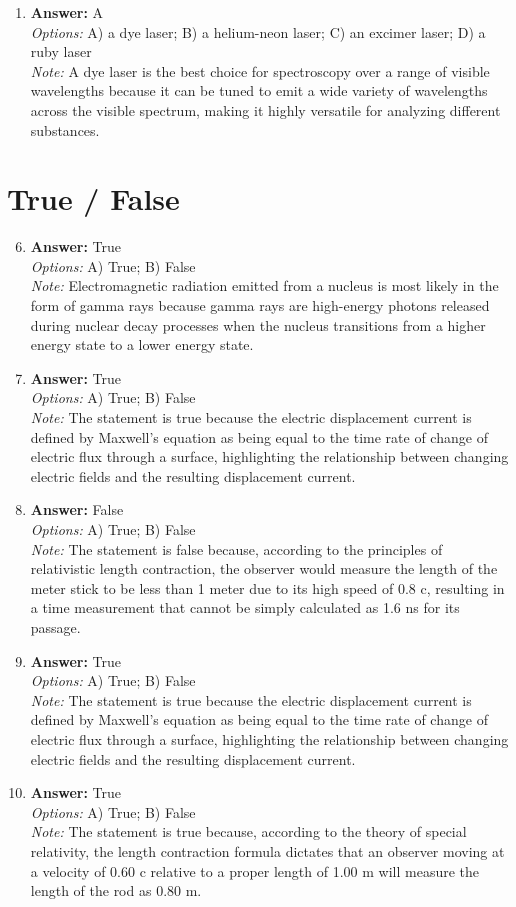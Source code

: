 \documentclass[12pt]{article}
\begin{document}
\begin{enumerate}[label=\arabic*.]
\item \textbf{Answer:} A
\\ \textit{Options:} A) a dye laser; B) a helium-neon laser; C) an excimer laser; D) a ruby laser
\\ \textit{Note:} A dye laser is the best choice for spectroscopy over a range of visible wavelengths because it can be tuned to emit a wide variety of wavelengths across the visible spectrum, making it highly versatile for analyzing different substances.
\end{enumerate}

\section*{True / False}
\begin{enumerate}[label=\arabic*.]
\setcounter{enumi}{5}
\item \textbf{Answer:} True
\\ \textit{Options:} A) True; B) False
\\ \textit{Note:} Electromagnetic radiation emitted from a nucleus is most likely in the form of gamma rays because gamma rays are high-energy photons released during nuclear decay processes when the nucleus transitions from a higher energy state to a lower energy state.
\item \textbf{Answer:} True
\\ \textit{Options:} A) True; B) False
\\ \textit{Note:} The statement is true because the electric displacement current is defined by Maxwell's equation as being equal to the time rate of change of electric flux through a surface, highlighting the relationship between changing electric fields and the resulting displacement current.
\item \textbf{Answer:} False
\\ \textit{Options:} A) True; B) False
\\ \textit{Note:} The statement is false because, according to the principles of relativistic length contraction, the observer would measure the length of the meter stick to be less than 1 meter due to its high speed of 0.8 c, resulting in a time measurement that cannot be simply calculated as 1.6 ns for its passage.
\item \textbf{Answer:} True
\\ \textit{Options:} A) True; B) False
\\ \textit{Note:} The statement is true because the electric displacement current is defined by Maxwell's equation as being equal to the time rate of change of electric flux through a surface, highlighting the relationship between changing electric fields and the resulting displacement current.
\item \textbf{Answer:} True
\\ \textit{Options:} A) True; B) False
\\ \textit{Note:} The statement is true because, according to the theory of special relativity, the length contraction formula dictates that an observer moving at a velocity of 0.60 c relative to a proper length of 1.00 m will measure the length of the rod as 0.80 m.
\end{enumerate}
\end{document}
